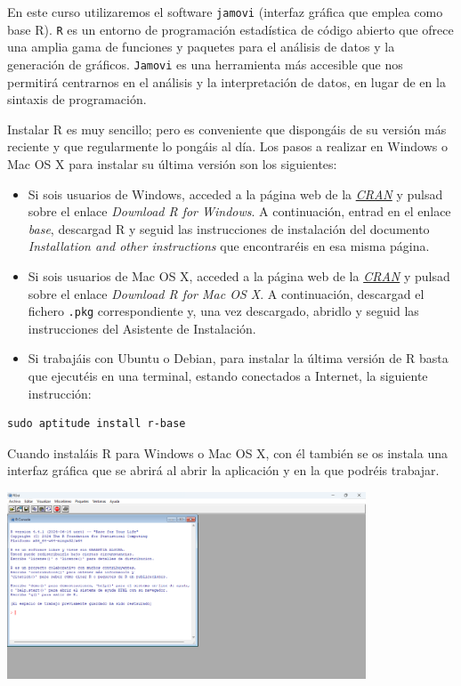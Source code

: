 \documentclass[
  letterpaper,
  DIV=11,
  numbers=noendperiod]{scrreprt}
\begin{document}
En este curso utilizaremos el software \texttt{jamovi} (interfaz gráfica
que emplea como base R). \texttt{R} es un entorno de programación
estadística de código abierto que ofrece una amplia gama de funciones y
paquetes para el análisis de datos y la generación de gráficos.
\texttt{Jamovi} es una herramienta más accesible que nos permitirá
centrarnos en el análisis y la interpretación de datos, en lugar de en
la sintaxis de programación.

Instalar R es muy sencillo; pero es conveniente que dispongáis de su
versión más reciente y que regularmente lo pongáis al día. Los pasos a
realizar en Windows o Mac OS X para instalar su última versión son los
siguientes:

\begin{itemize}
\item
  Si sois usuarios de Windows, acceded a la página web de la
  \href{http://cran.r-project.org/}{\emph{CRAN}} y pulsad sobre el
  enlace \emph{Download R for Windows}. A continuación, entrad en el
  enlace \emph{base}, descargad R y seguid las instrucciones de
  instalación del documento \emph{Installation and other instructions}
  que encontraréis en esa misma página.
\item
  Si sois usuarios de Mac OS X, acceded a la página web de la
  \href{http://cran.r-project.org/}{\emph{CRAN}} y pulsad sobre el
  enlace \emph{Download R for Mac OS X}. A continuación, descargad el
  fichero \texttt{.pkg} correspondiente y, una vez descargado, abridlo y
  seguid las instrucciones del Asistente de Instalación.
\item
  Si trabajáis con Ubuntu o Debian, para instalar la última versión de R
  basta que ejecutéis en una terminal, estando conectados a Internet, la
  siguiente instrucción:
\end{itemize}

\begin{verbatim}
sudo aptitude install r-base
\end{verbatim}

Cuando instaláis R para Windows o Mac OS X, con él también se os instala
una interfaz gráfica que se abrirá al abrir la aplicación y en la que
podréis trabajar.

\begin{center}
\includegraphics[width=0.8\textwidth,height=\textheight]{Figuras/RTerminal.png}
\end{center}
\end{document}
